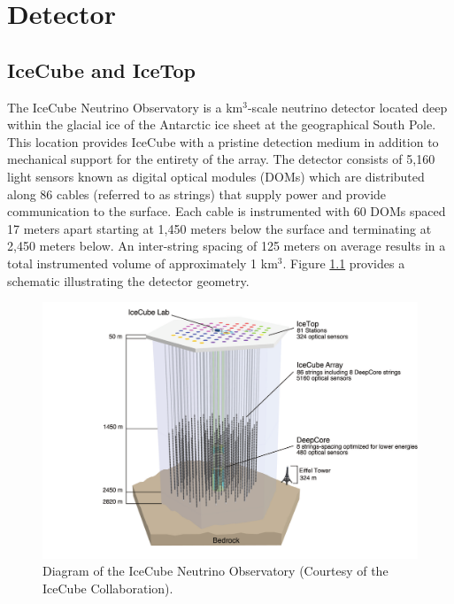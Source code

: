 \documentclass{gatech-thesis}
\begin{document}

\chapter{Detector}
\section{IceCube and IceTop}
The IceCube Neutrino Observatory is a km$^{3}$-scale neutrino detector located deep within the glacial ice of the Antarctic ice sheet at the geographical South Pole. This location provides IceCube with a pristine detection medium in addition to mechanical support for the entirety of the array. The detector consists of 5,160 light sensors known as digital optical modules (DOMs) which are distributed along 86 cables (referred to as strings) that supply power and provide communication to the surface. Each cable is instrumented with 60 DOMs spaced 17 meters apart starting at 1,450 meters below the surface and terminating at 2,450 meters below. An inter-string spacing of 125 meters on average results in a total instrumented volume of approximately 1 km$^{3}$. Figure \ref{fig:icecube} provides a schematic illustrating the detector geometry.

\begin{figure}[ht]
  \begin{center}
    \includegraphics[width=1.0\textwidth,keepaspectratio]{ArrayWSeasonsLabels.pdf}
  \end{center}
  \caption{Diagram of the IceCube Neutrino Observatory (Courtesy of the IceCube Collaboration).}
  \label{fig:icecube}
\end{figure}
\end{document}
